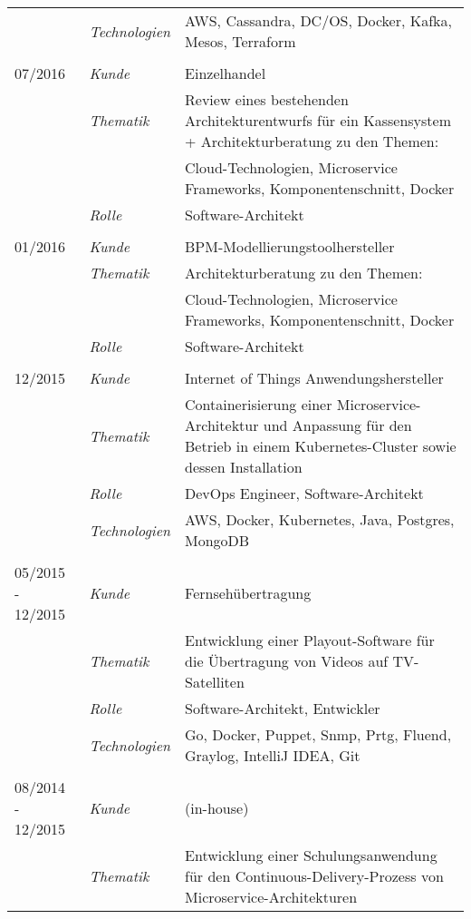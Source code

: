 \begin{longtable}{@{}>{}p{4cm}>{\itshape}p{2cm}>{}p{9cm}}
\nopagebreak		& Technologien	& AWS, Cassandra, DC/OS, Docker, Kafka, Mesos, Terraform\\
\\
07/2016             & Kunde 	    & Einzelhandel\\
\nopagebreak		& Thematik	    & Review eines bestehenden Architekturentwurfs für ein Kassensystem + Architekturberatung zu den Themen:\\
\nopagebreak		&           	& Cloud-Technologien, Microservice Frameworks, Komponentenschnitt, Docker\\
\nopagebreak		& Rolle 	    & Software-Architekt\\
\\
01/2016             & Kunde 	    & BPM-Modellierungstoolhersteller\\
\nopagebreak		& Thematik	    & Architekturberatung zu den Themen:\\
\nopagebreak		&           	& Cloud-Technologien, Microservice Frameworks, Komponentenschnitt, Docker\\
\nopagebreak		& Rolle 	    & Software-Architekt\\
\\
12/2015             & Kunde 	    & Internet of Things Anwendungshersteller\\
\nopagebreak		& Thematik	    & Containerisierung einer Microservice-Architektur und Anpassung für den Betrieb in einem Kubernetes-Cluster sowie dessen Installation\\
\nopagebreak		& Rolle 	    & DevOps Engineer, Software-Architekt\\
\nopagebreak		& Technologien	& AWS, Docker, Kubernetes, Java, Postgres, MongoDB\\
\\
05/2015 - 12/2015     & Kunde 	    & Fernsehübertragung\\
\nopagebreak		& Thematik	    & Entwicklung einer Playout-Software für die Übertragung von Videos auf TV-Satelliten\\
\nopagebreak		& Rolle 	    & Software-Architekt, Entwickler\\
\nopagebreak		& Technologien	& Go, Docker, Puppet, Snmp, Prtg, Fluend, Graylog, IntelliJ IDEA, Git\\
\\
08/2014 - 12/2015     & Kunde 	    & (in-house)\\
\nopagebreak		& Thematik	    & Entwicklung einer Schulungsanwendung für den Continuous-Delivery-Prozess von Microservice-Architekturen\\

\end{longtable}
